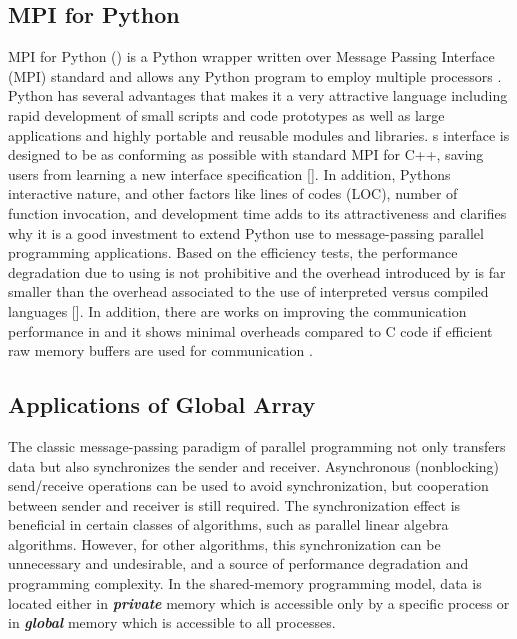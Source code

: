 \label{background}

\subsection{MPI for Python }
MPI for Python () is a Python wrapper written over Message Passing Interface (MPI) standard and allows any Python program to employ multiple processors \citep{Dalcin:2011aa, Dalcin:2005aa}.
Python has several advantages that makes it a very attractive language including rapid development of small scripts and code prototypes as well as large applications and highly portable and reusable modules and libraries.
\textquotesingle s interface is designed to be as conforming as possible with standard MPI for C++, saving users from learning a new interface specification []. 
In addition, Python\textquotesingle s interactive nature, and other factors like lines of codes (LOC), number of function invocation, and development time adds to its attractiveness and clarifies why it is a good investment to extend Python use to message-passing parallel programming applications.
Based on the efficiency tests, the performance degradation due to using  is not prohibitive and the overhead introduced by  is far smaller than the overhead associated to the use of interpreted versus compiled languages [].
In addition, there are works on improving the communication performance in  and it shows minimal overheads compared to C code if efficient raw memory buffers are used for communication \citep{Dalcin:2011aa}.

\subsection{Applications of Global Array}
The classic message-passing paradigm of parallel programming not only transfers data but also synchronizes the sender and receiver. 
Asynchronous (nonblocking) send/receive operations can be used to avoid synchronization, but cooperation between sender and receiver is still required. 
The synchronization effect is beneficial in certain classes of algorithms, such as parallel linear algebra algorithms.
However, for other algorithms, this synchronization can be unnecessary and undesirable, and a source of performance degradation and programming complexity. 
In the shared-memory programming model, data is located either in \textbf{\textit{private}} memory which is accessible only by a specific process or in \textbf{\textit{global}} memory which is accessible to all processes. 

